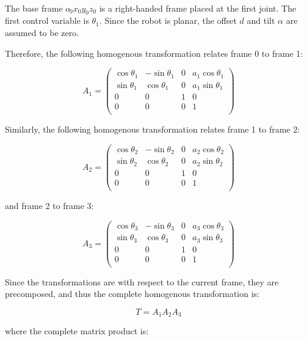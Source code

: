 \documentclass{article}
\begin{document}
\paragraph{}

The base frame $o_0 x_0 y_0 z_0$ is a right-handed frame placed
	at the first joint.
The first control variable is $\theta_1$.
Since the robot is planar, the offset $d$ and tilt $\alpha$ are assumed 
	to be zero.


Therefore, the following homogenous transformation relates frame 0 to 
	frame 1:

\[ A_1 = \left( 
	\begin{matrix}
		\cos \theta_1 & - \sin \theta_1 & 0 & a_1 \cos \theta_1\\
		\sin \theta_1 & \cos \theta_1 & 0 & a_1 \sin \theta_1 \\
		0 & 0 & 1 & 0\\
		0 & 0 & 0 & 1 \\
	\end{matrix} \right) \]

Similarly, the following homogenous transformation relates frame 1 to frame 2:


\[ A_2 = \left( 
	\begin{matrix}
		\cos \theta_2 & - \sin \theta_2 & 0 & a_2 \cos \theta_2\\
		\sin \theta_2 & \cos \theta_2 & 0 & a_2 \sin \theta_2 \\
		0 & 0 & 1 & 0\\
		0 & 0 & 0 & 1 \\
	\end{matrix} \right) \]

and frame 2 to frame 3:

\[ A_3 = \left( 
	\begin{matrix}
		\cos \theta_3 & - \sin \theta_3 & 0 & a_3 \cos \theta_3\\
		\sin \theta_3 & \cos \theta_3 & 0 & a_3 \sin \theta_3 \\
		0 & 0 & 1 & 0\\
		0 & 0 & 0 & 1 \\
	\end{matrix} \right) \]

Since the transformations are with respect to the current frame, they are precomposed,
	and thus the complete homogenous transformation is:

\[ T = A_1 A_2 A_3 \]

where the complete matrix product is:
\end{document}
